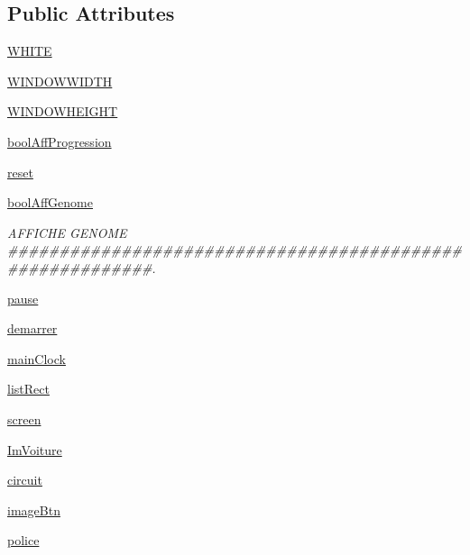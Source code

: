 \subsection*{Public Attributes}
\begin{DoxyCompactItemize}
\item 
\hyperlink{classaffichage_1_1_affichage_a83fc01f0d1bed94859d7f945e4c119ce}{W\+H\+I\+TE}
\item 
\hyperlink{classaffichage_1_1_affichage_aab192d8bb91c1687fb02898a80beecf1}{W\+I\+N\+D\+O\+W\+W\+I\+D\+TH}
\item 
\hyperlink{classaffichage_1_1_affichage_ad9105ba379e4d18342b3aee4ea199ab4}{W\+I\+N\+D\+O\+W\+H\+E\+I\+G\+HT}
\item 
\hyperlink{classaffichage_1_1_affichage_af65584cd9fab64ae77b2f27c59e4f346}{bool\+Aff\+Progression}
\item 
\hyperlink{classaffichage_1_1_affichage_a2e403c62c0b5ec8893d3a66f17a16384}{reset}
\item 
\hyperlink{classaffichage_1_1_affichage_a5ae8cd3838187cd4b0ebab27b1da1e16}{bool\+Aff\+Genome}
\begin{DoxyCompactList}\small\item\em A\+F\+F\+I\+C\+HE G\+E\+N\+O\+ME \#\#\#\#\#\#\#\#\#\#\#\#\#\#\#\#\#\#\#\#\#\#\#\#\#\#\#\#\#\#\#\#\#\#\#\#\#\#\#\#\#\#\#\#\#\#\#\#\#\#\#\#\#\#\#\#\#\#. \end{DoxyCompactList}\item 
\hyperlink{classaffichage_1_1_affichage_a9092af498d35b0d67bd3766808d17ec3}{pause}
\item 
\hyperlink{classaffichage_1_1_affichage_a156e18adf2b1849d7b944ad0dc765ea5}{demarrer}
\item 
\hyperlink{classaffichage_1_1_affichage_af2f5584c1a3de62a20737fe7fe5dd1c0}{main\+Clock}
\item 
\hyperlink{classaffichage_1_1_affichage_a3d63bdab0c70e2a7a746896b33b36e35}{list\+Rect}
\item 
\hyperlink{classaffichage_1_1_affichage_a7b058db87aafd3b45c8f034df0d003cb}{screen}
\item 
\hyperlink{classaffichage_1_1_affichage_a23d2c252245a15bedabd207f7bb2378e}{Im\+Voiture}
\item 
\hyperlink{classaffichage_1_1_affichage_ab81a15d6f5eb57911b1a8a2b1b2f43cb}{circuit}
\item 
\hyperlink{classaffichage_1_1_affichage_a2580d08d45179ad65a28ae58c5f9d9b6}{image\+Btn}
\item 
\hyperlink{classaffichage_1_1_affichage_a5a0678437f947889167137bd1e87108e}{police}

\end{DoxyCompactItemize}
